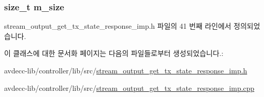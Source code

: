 \subsubsection[{\texorpdfstring{m\+\_\+size}{m_size}}]{\setlength{\rightskip}{0pt plus 5cm}size\+\_\+t m\+\_\+size\hspace{0.3cm}{\ttfamily [private]}}\hypertarget{classavdecc__lib_1_1stream__output__get__tx__state__response__imp_a0dc3c363255f193681c77b4d2a82e995}{}\label{classavdecc__lib_1_1stream__output__get__tx__state__response__imp_a0dc3c363255f193681c77b4d2a82e995}


stream\+\_\+output\+\_\+get\+\_\+tx\+\_\+state\+\_\+response\+\_\+imp.\+h 파일의 41 번째 라인에서 정의되었습니다.



이 클래스에 대한 문서화 페이지는 다음의 파일들로부터 생성되었습니다.\+:\begin{DoxyCompactItemize}
\item 
avdecc-\/lib/controller/lib/src/\hyperlink{stream__output__get__tx__state__response__imp_8h}{stream\+\_\+output\+\_\+get\+\_\+tx\+\_\+state\+\_\+response\+\_\+imp.\+h}\item 
avdecc-\/lib/controller/lib/src/\hyperlink{stream__output__get__tx__state__response__imp_8cpp}{stream\+\_\+output\+\_\+get\+\_\+tx\+\_\+state\+\_\+response\+\_\+imp.\+cpp}\end{DoxyCompactItemize}
